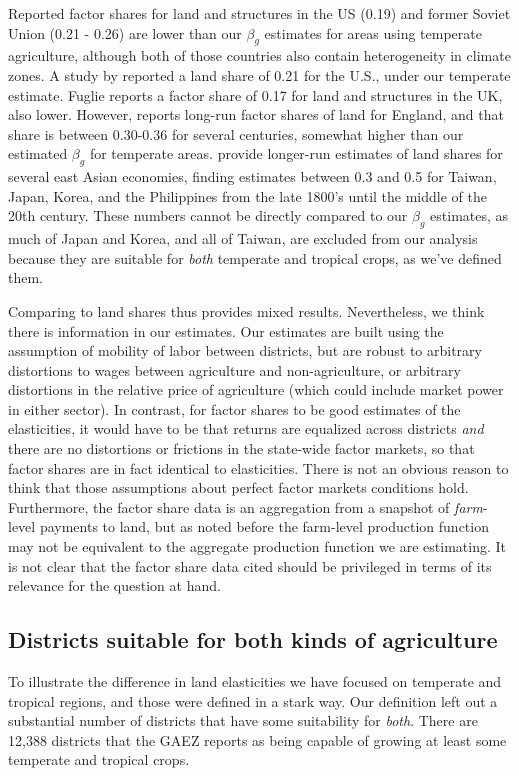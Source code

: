 \documentclass[12pt]{article}
\begin{document}
Reported factor shares for land and structures in the US (0.19) and former Soviet Union (0.21 - 0.26) are lower than our $\beta_g$ estimates for areas using temperate agriculture, although both of those countries also contain heterogeneity in climate zones. A study by \citet{jg1992} reported a land share of 0.21 for the U.S., under our temperate estimate. Fuglie reports a factor share of 0.17 for land and structures in the UK, also lower. However, \citet{Clark2002} reports long-run factor shares of land for England, and that share is between 0.30-0.36 for several centuries, somewhat higher than our estimated $\beta_g$ for temperate areas. \citet{hrs1979} provide longer-run estimates of land shares for several east Asian economies, finding estimates between 0.3 and 0.5 for Taiwan, Japan, Korea, and the Philippines from the late 1800's until the middle of the 20th century. These numbers cannot be directly compared to our $\beta_g$ estimates, as much of Japan and Korea, and all of Taiwan, are excluded from our analysis because they are suitable for \textit{both} temperate and tropical crops, as we've defined them. 

Comparing to land shares thus provides mixed results. Nevertheless, we think there is information in our estimates. Our estimates are built using the assumption of mobility of labor between districts, but are robust to arbitrary distortions to wages between agriculture and non-agriculture, or arbitrary distortions in the relative price of agriculture (which could include market power in either sector). In contrast, for factor shares to be good estimates of the elasticities, it would have to be that returns are equalized across districts \textit{and} there are no distortions or frictions in the state-wide factor markets, so that factor shares are in fact identical to elasticities. There is not an obvious reason to think that those assumptions about perfect factor markets conditions hold. Furthermore, the factor share data is an aggregation from a snapshot of \textit{farm}-level payments to land, but as noted before the farm-level production function may not be equivalent to the aggregate production function we are estimating. It is not clear that the factor share data cited should be privileged in terms of its relevance for the question at hand.

\subsection{Districts suitable for both kinds of agriculture}
To illustrate the difference in land elasticities we have focused on temperate and tropical regions, and those were defined in a stark way. Our definition left out a substantial number of districts that have some suitability for \textit{both}. There are 12,388 districts that the GAEZ reports as being capable of growing at least some temperate and tropical crops. 
\end{document}
